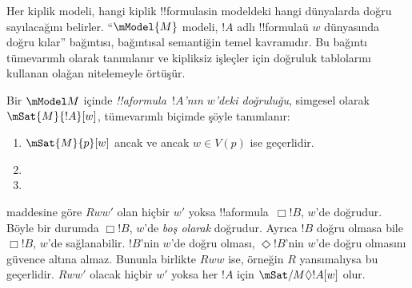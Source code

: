 \documentclass[../../../include/open-logic-section]{subfiles}
\begin{document}


Her kiplik modeli, hangi kiplik !!{formula}s{}in modeldeki hangi dünyalarda
doğru sayılacağını belirler. ``$\mModel{M}$ modeli, $!A$ adlı !!{formula}{}ü
$w$ dünyasında doğru kılar'' bağıntısı, bağıntısal semantiğin temel
kavramıdır. Bu bağıntı tümevarımlı olarak tanımlanır ve kipliksiz işleçler
için doğruluk tablolarını kullanan olağan nitelemeyle örtüşür.

\begin{defn}
  Bir $\mModel M$ içinde \emph{!!a{formula}~$!A$'nın $w$'deki doğruluğu},
  simgesel olarak $\mSat{M}{!A}[w]$, tümevarımlı biçimde şöyle tanımlanır:
  \begin{enumerate}
  \item $\mSat{M}{p}[w]$ ancak ve ancak $w \in V(p)$ ise geçerlidir.
  \item{}
  \item{}
  \end{enumerate}
\end{defn}

 maddesine göre $Rww'$ olan hiçbir $w'$ yoksa
!!a{formula}~$\Box !B$, $w$'de doğrudur. Böyle bir durumda $\Box !B$,
$w$'de \emph{boş olarak} doğrudur. Ayrıca $!B$ doğru olmasa bile
$\Box !B$, $w$'de sağlanabilir. $!B$'nin $w$'de doğru olması,
$\Diamond !B$'nin $w$'de doğru olmasını güvence altına almaz. Bununla
birlikte $Rww$ ise, örneğin $R$ yansımalıysa bu geçerlidir. $Rww'$ olacak
hiçbir $w'$ yoksa her $!A$ için $\mSat/{M}{\Diamond !A}[w]$ olur.
\end{document}
